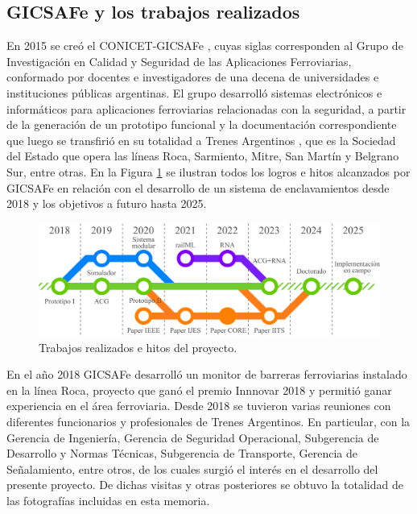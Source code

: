 \subsection{GICSAFe y los trabajos realizados}
 	\label{sec:GICSAFE}

    En 2015 se creó el CONICET-GICSAFe \cite{GICSAFE}, cuyas siglas corresponden al Grupo de Investigación en Calidad y Seguridad de las Aplicaciones Ferroviarias, conformado por docentes e investigadores de una decena de universidades e instituciones públicas argentinas. El grupo desarrolló sistemas electrónicos e informáticos para aplicaciones ferroviarias relacionadas con la seguridad, a partir de la generación de un prototipo funcional y la documentación correspondiente que luego se transfirió en su totalidad a Trenes Argentinos \cite{TRENES}, que es la Sociedad del Estado que opera las líneas Roca, Sarmiento, Mitre, San Martín y Belgrano Sur, entre otras. En la Figura \ref{fig:contexto} se ilustran todos los logros e hitos alcanzados por GICSAFe en relación con el desarrollo de un sistema de enclavamientos desde 2018 y los objetivos a futuro hasta 2025.

    \begin{figure}[H]
        \centering
        \includegraphics[width=1\textwidth]{Figuras/hojaDeRuta}
        \centering\caption{Trabajos realizados e hitos del proyecto.}
        \label{fig:contexto}
    \end{figure}

    En el año 2018 GICSAFe desarrolló un monitor de barreras ferroviarias instalado en la línea Roca, proyecto que ganó el premio Innnovar 2018 \cite{INNOVAR_1,INNOVAR_2} y permitió ganar experiencia en el área ferroviaria. Desde 2018 se tuvieron varias reuniones con diferentes funcionarios y profesionales de Trenes Argentinos. En particular, con la Gerencia de Ingeniería, Gerencia de Seguridad Operacional, Subgerencia de Desarrollo y Normas Técnicas, Subgerencia de Transporte, Gerencia de Señalamiento, entre otros, de los cuales surgió el interés en el desarrollo del presente proyecto. De dichas visitas y otras posteriores se obtuvo la totalidad de las fotografías incluidas en esta memoria. 

